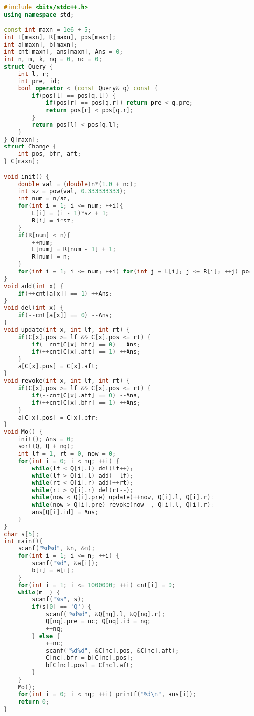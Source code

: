 \begin{lstlisting}[language=C++]
#include <bits/stdc++.h>
using namespace std;

const int maxn = 1e6 + 5;
int L[maxn], R[maxn], pos[maxn];
int a[maxn], b[maxn];
int cnt[maxn], ans[maxn], Ans = 0;
int n, m, k, nq = 0, nc = 0;
struct Query {
    int l, r;
    int pre, id;
    bool operator < (const Query& q) const {
        if(pos[l] == pos[q.l]) {
            if(pos[r] == pos[q.r]) return pre < q.pre;
            return pos[r] < pos[q.r];
        }
        return pos[l] < pos[q.l];
    }
} Q[maxn];
struct Change {
    int pos, bfr, aft;
} C[maxn];

void init() {
    double val = (double)n*(1.0 + nc);
    int sz = pow(val, 0.333333333);
    int num = n/sz;
    for(int i = 1; i <= num; ++i){
        L[i] = (i - 1)*sz + 1;
        R[i] = i*sz;
    }
    if(R[num] < n){
        ++num;
        L[num] = R[num - 1] + 1;
        R[num] = n;
    }
    for(int i = 1; i <= num; ++i) for(int j = L[i]; j <= R[i]; ++j) pos[j] = i;
}
void add(int x) {
    if(++cnt[a[x]] == 1) ++Ans;
}
void del(int x) {
    if(--cnt[a[x]] == 0) --Ans;
}
void update(int x, int lf, int rt) {
    if(C[x].pos >= lf && C[x].pos <= rt) {
        if(--cnt[C[x].bfr] == 0) --Ans;
        if(++cnt[C[x].aft] == 1) ++Ans;
    }
    a[C[x].pos] = C[x].aft;
}
void revoke(int x, int lf, int rt) {
    if(C[x].pos >= lf && C[x].pos <= rt) {
        if(--cnt[C[x].aft] == 0) --Ans;
        if(++cnt[C[x].bfr] == 1) ++Ans;
    }
    a[C[x].pos] = C[x].bfr;
}
void Mo() {
    init(); Ans = 0;
    sort(Q, Q + nq);
    int lf = 1, rt = 0, now = 0;
    for(int i = 0; i < nq; ++i) {
        while(lf < Q[i].l) del(lf++);
        while(lf > Q[i].l) add(--lf);
        while(rt < Q[i].r) add(++rt);
        while(rt > Q[i].r) del(rt--);
        while(now < Q[i].pre) update(++now, Q[i].l, Q[i].r);
        while(now > Q[i].pre) revoke(now--, Q[i].l, Q[i].r);
        ans[Q[i].id] = Ans;
    }
}
char s[5];
int main(){
    scanf("%d%d", &n, &m);
    for(int i = 1; i <= n; ++i) {
        scanf("%d", &a[i]);
        b[i] = a[i];
    }
    for(int i = 1; i <= 1000000; ++i) cnt[i] = 0;
    while(m--) {
        scanf("%s", s);
        if(s[0] == 'Q') {
            scanf("%d%d", &Q[nq].l, &Q[nq].r);
            Q[nq].pre = nc; Q[nq].id = nq;
            ++nq;
        } else {
            ++nc;
            scanf("%d%d", &C[nc].pos, &C[nc].aft);
            C[nc].bfr = b[C[nc].pos];
            b[C[nc].pos] = C[nc].aft;
        }
    }
    Mo();
    for(int i = 0; i < nq; ++i) printf("%d\n", ans[i]);
    return 0;
}
\end{lstlisting}

